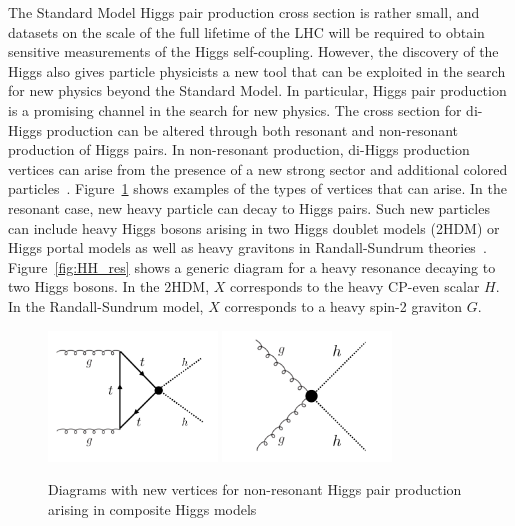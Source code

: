 The Standard Model Higgs pair production cross section is rather small, and datasets on the scale of the full lifetime of the LHC will be required to obtain sensitive measurements of the Higgs self-coupling. However, the discovery of the Higgs also gives particle physicists a new tool that can be exploited in the search for new physics beyond the Standard Model. In particular, Higgs pair production is a promising channel in the search for new physics. The cross section for di-Higgs production can be altered through both resonant and non-resonant production of Higgs pairs. In non-resonant production, di-Higgs production vertices can arise from the presence of a new strong sector and additional colored particles~\cite{HH_NewPhys,AnomalousHHVertex,CompositeDiHiggs}. Figure~\ref{fig:HH_nonres} shows examples of the types of vertices that can arise. In the resonant case, new heavy particle can decay to Higgs pairs. Such new particles can include heavy Higgs bosons arising in two Higgs doublet models (2HDM) or Higgs portal models as well as heavy gravitons in Randall-Sundrum theories~\cite{HH_NewPhys,RSG1,RSG_LHC,RSG_LHC2,HH_2HDM,2HDM2,2HDM3,HiggsPortal}. Figure~\ref{fig:HH_res} shows a generic diagram for a heavy resonance decaying to two Higgs bosons. In the 2HDM, $X$ corresponds to the heavy CP-even scalar $H$. In the Randall-Sundrum model, $X$ corresponds to a heavy spin-2 graviton $G$. 
%
\begin{figure}[h!]
  \centering
  \captionsetup{justification=centering}

  \includegraphics[width=0.4\textwidth]{figures/HH_nonres1}
  \includegraphics[width=0.4\textwidth]{figures/HH_nonres2}
   \caption{Diagrams with new vertices for non-resonant Higgs pair production arising in composite Higgs models}
  \label{fig:HH_nonres}
\end{figure}

